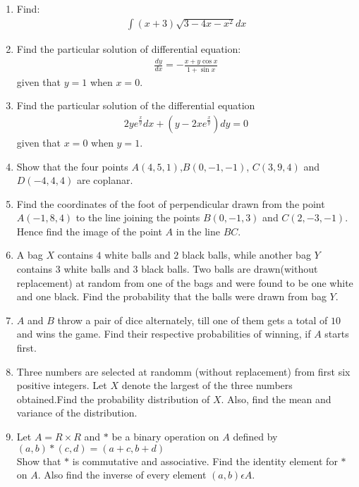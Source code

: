 \documentclass[12pt,-letter paper]{article}
\providecommand{\brak}[1]{\ensuremath{\left(#1\right)}}
\begin{document}
 \begin{enumerate}


    \item Find:\begin{align*}\int{\brak{x+3}}\sqrt{3-4x-x^2}dx  \end{align*}

    \item Find the particular solution of differential equation:\begin{align*}  \frac{dy}{dx}=-\frac{x+y\cos x}{1+\sin x} \end{align*} given that $y=1$ when $x=0$.

	    \item Find the particular solution of the differential equation\begin{align*} 2ye^\frac{x}{y}dx+\brak{{y-2xe^\frac{x}{y}}}dy=0 \end{align*} given that $x=0$  when $y=1$.

		    \item Show that the four points $A\brak{4,5,1}$,$B\brak{0,-1,-1}$, $C\brak{3,9,4}$ and $D\brak{-4,4,4}$ are coplanar.

		    \item Find the coordinates of the foot of perpendicular drawn from the point $A\brak{-1,8,4}$ to the line joining the points $B\brak{0,-1,3}$ and $C\brak{2,-3,-1}$. Hence find the image of the point $A$ in the line $BC$.
		    \item A bag $X$ contains $4$ white balls and $2$ black balls, while another bag $Y$ contains $3$ white balls and $3$ black balls. Two balls are drawn(without replacement) at random from one of the bags and were found to be one white and one black. Find the probability that the balls were drawn from bag $Y$.

    \item $A$ and $B$ throw a pair of dice alternately,     till one of them gets a total of $10$ and wins the game. Find their respective probabilities of winning, if $A$ starts first.

    \item Three numbers are selected at randomm (without replacement) from first six positive integers. Let $X$ denote the largest of the three numbers obtained.Find the probability distribution of $X$. Also, find the mean and variance of the distribution.
		          
    \item Let $A=R\times R$ and $*$ be a binary operation on $A$ defined by\\ $\brak{a,b}*\brak{c,d}=\brak{a+c,b+d}$\\
		          Show that $*$ is commutative and associative. Find the identity element for $*$ on $A$. Also find the inverse of every element $\brak{a,b}\epsilon A$.


\end{enumerate}
\end{document}
